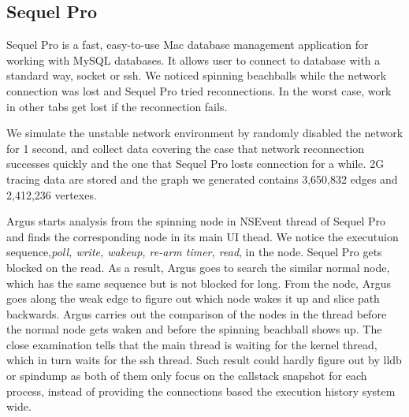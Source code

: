 \subsection{Sequel Pro}

Sequel Pro is a fast, easy-to-use Mac database management application for
working with MySQL databases. It allows user to connect to database with a
standard way, socket or ssh. We noticed spinning beachballs while the network
connection was lost and Sequel Pro tried reconnections. In the worst case, work
in other tabs get lost if the reconnection fails.

We simulate the unstable network environment by randomly disabled the network
for 1 second, and collect data covering the case that network reconnection
successes quickly and the one that Sequel Pro losts connection for a while. 2G
tracing data are stored and the graph we generated contains 3,650,832 edges
and 2,412,236 vertexes.

Argus starts analysis from the spinning node in NSEvent thread of Sequel Pro
and finds the corresponding node in its main UI thead. We notice the executuion
sequence,\textit{poll, write, wakeup, re-arm timer, read}, in the node. Sequel
Pro gets blocked on the read. As a result, Argus goes to search the similar
normal node, which has the same sequence but is not blocked for long.  From the
node, Argus goes along the weak edge to figure out which node wakes it up and
slice path backwards.  Argus carries out the comparison of the nodes in the
thread before the normal node gets waken and before the spinning beachball
shows up. The close examination tells that the main thread is waiting for the
kernel thread, which in turn waits for the ssh thread. Such result could hardly
figure out by lldb or spindump as both of them only focus on the callstack
snapshot for each process, instead of providing the connections based the
execution history system wide.
